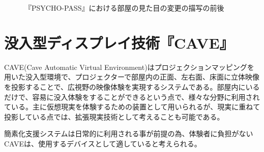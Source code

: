 \begin{figure}[htbp]
  \begin{minipage}{0.5\hsize}
    \begin{center}
    \end{center}
  \end{minipage}
  \begin{minipage}{0.5\hsize}
    \begin{center}
    \end{center}
  \end{minipage}
  \caption{『PSYCHO-PASS』における部屋の見た目の変更の描写の前後}
  \label{fig:psycho}
\end{figure}

\section{没入型ディスプレイ技術『CAVE』}

CAVE(Cave Automatic Virtual Environment)\cite{cave}はプロジェクションマッピングを用いた没入型環境で、プロジェクターで部屋内の正面、左右面、床面に立体映像を投影することで、広視野の映像体験を実現するシステムである。部屋内にいるだけで、容易に没入体験をすることができるという点で、様々な分野に利用されている。主に仮想現実を体験するための装置として用いられるが、現実に重ねて投影している点では、拡張現実技術として考えることも可能である。

簡素化支援システムは日常的に利用される事が前提の為、体験者に負担がないCAVEは、使用するデバイスとして適していると考えられる。


